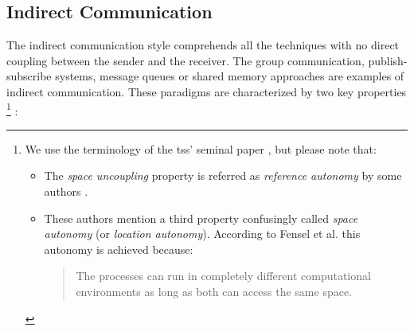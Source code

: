 





\subsection{Indirect Communication}
\label{sec:indirect_communication}

The indirect communication style comprehends all the techniques with no direct coupling between the sender and the receiver.
The group communication, publish-subscribe systems, message queues or shared memory approaches are examples of indirect communication.
These paradigms are characterized by two key properties \cite{gelernter_generative_1985,coulouris_distributed_2012}
\footnote{
  We use the terminology of the  \aclp{ts}' seminal paper \cite{gelernter_generative_1985}, but please note that:
  \begin{itemize}
    \item The \emph{space uncoupling} property is referred as \emph{reference autonomy} by some authors \cite{fensel_triple-space_2004}.
    \item These authors mention a third property confusingly called \emph{space autonomy} (or \emph{location autonomy}).
	  According to Fensel et al.\cite{fensel_triple-space_2004} this autonomy is achieved because:
	  \begin{quote}
	    The processes can run in completely different computational environments as long as both can access the same space.
	  \end{quote}
  \end{itemize}
}
:


